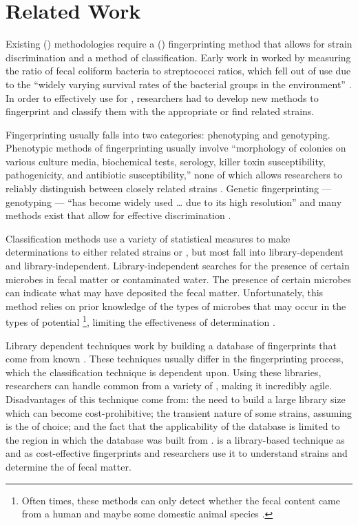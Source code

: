 \chapter{Related Work}\label{chap:related-work}

Existing \MSTlong{} (\mst{}) methodologies require a \fiblong{} (\fib{}) fingerprinting method that allows for strain discrimination and a method of classification.
Early work in \mst{} \cite{bitton2005microbial} worked by measuring the ratio of fecal coliform bacteria to streptococci ratios, which fell out of use due to the ``widely varying survival rates of the bacterial groups in the environment'' \cite{sargeant2011review}.
In order to effectively use \fib{} for \mst{}, researchers had to develop new methods to fingerprint and classify them with the appropriate \spec{} or find related strains.

Fingerprinting \fib{} usually falls into two categories: phenotyping and genotyping.
Phenotypic methods of fingerprinting usually involve ``morphology of colonies on various culture media, biochemical tests, serology, killer toxin susceptibility, pathogenicity, and antibiotic susceptibility,'' none of which allows researchers to reliably distinguish between closely related strains \cite{Li892}.
Genetic fingerprinting --- genotyping --- ``has become widely used \dots{} due to its high resolution'' \cite{Li892} and many methods exist that allow for effective discrimination \cite{scott2002microbial, sargeant2011review}.

Classification methods use a variety of statistical measures to make determinations to either related strains or \spec{}, but most fall into library-dependent and library-independent.
Library-independent \mst{} searches for the presence of certain microbes in fecal matter or contaminated water.
The presence of certain microbes can indicate what \spec{} may have deposited the fecal matter.
Unfortunately, this method relies on prior knowledge of the types of microbes that may occur in the types of potential \spec{}\footnote{Often times, these methods can only detect whether the fecal content came from a human and maybe some domestic animal species \cite{sargeant2011review}.}, limiting the effectiveness of \spec{} determination \cite{sargeant2011review}.

Library dependent techniques work by building a database of \fib{} fingerprints that come from known \spec{}.
These techniques usually differ in the fingerprinting process, which the classification technique is dependent upon.
Using these libraries, researchers can handle common \fib{} from a variety of \spec{}, making it incredibly agile.
Disadvantages of this technique come from: the need to build a large library size which can become cost-prohibitive; the transient nature of some \ecoli{} strains, assuming \ecoli{} is the \fib{} of choice; and the fact that the applicability of the database is limited to the region in which the database was built from \cite{sargeant2011review}.
\cplop{} is a library-based \mst{} technique \ecoli{} as \fib{} and \pyros{} as cost-effective fingerprints and researchers use it to understand \ecoli{} strains and determine the \spec{} of fecal matter.

